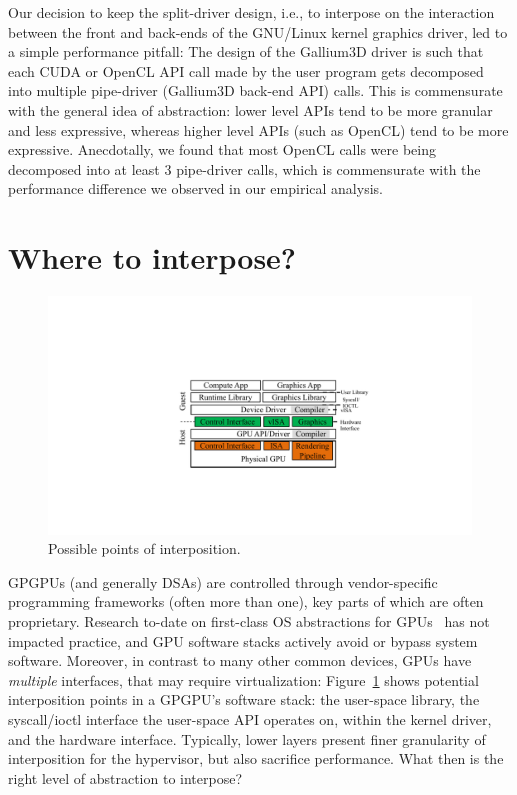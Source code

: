 Our decision to keep the split-driver design, i.e., to interpose on the
interaction between the front and back-ends of the GNU/Linux kernel graphics
driver, led to a simple performance pitfall: The design of the Gallium3D
driver is such that each CUDA or OpenCL API call made by the user program gets
decomposed into multiple pipe-driver (Gallium3D back-end API) calls. This is
commensurate with the general idea of abstraction: lower level APIs tend to be
more granular and less expressive, whereas higher level APIs (such as OpenCL)
tend to be more expressive. Anecdotally, we found that most OpenCL calls were
being decomposed into at least 3 pipe-driver calls, which is commensurate with
the performance difference we observed in our empirical analysis.

\section{Where to interpose?}

\begin{figure}[!tt]
	\centering
	\includegraphics[width=.5\linewidth,trim={10cm 5cm 8cm 6.5cm},clip]{figures/interposition.pdf}
	\caption{Possible points of interposition.}
	\label{fig_interposition}
\end{figure}

GPGPUs (and generally DSAs) are controlled through vendor-specific programming
frameworks (often more than one), key parts of which are often proprietary.
Research to-date on first-class OS abstractions for GPUs~\cite{ptask,dandelion,
silberstein2013gpufs,timegraph, gdev, gpunet} has not impacted practice, and
GPU software stacks actively avoid or bypass system software. Moreover, in
contrast to many other common devices, GPUs have \emph{multiple} interfaces,
that may require virtualization: Figure~\ref{fig_interposition} shows
potential interposition points in a GPGPU's software stack: the user-space
library, the syscall/ioctl interface the user-space API operates on, within
the kernel driver, and the hardware interface. Typically, lower layers present
finer granularity of interposition for the hypervisor, but also sacrifice
performance. What then is the right level of abstraction to interpose?

